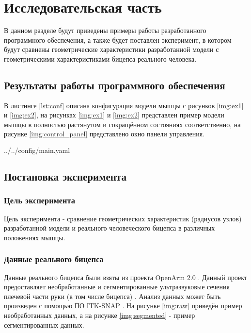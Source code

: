 \chapter{Исследовательская часть}

В данном разделе будут приведены примеры работы разработанного программного обеспечения, а также будет поставлен эксперимент, в котором будут сравнены геометрические характеристики разработанной модели с геометрическими характеристиками бицепса реального человека.

\section{Результаты работы программного обеспечения}

В листинге \ref{lst:conf} описана конфигурация модели мышцы с рисунков \ref{img:ex1} и \ref{img:ex2}, на рисунках \ref{img:ex1} и \ref{img:ex2} представлен пример модели мышцы в полностью растянутом и сокращённом состояниях соответственно, на рисунке \ref{img:control_panel} представлено окно панели управления.

\begin{lstinputlisting}[
        caption={Конфигурация для мышцы из примера.},
        label={lst:conf},
        style={rust}
    ]{../../config/main.yaml}
\end{lstinputlisting}
\clearpage
{}
\clearpage
{}

\section{Постановка эксперимента}

\subsection{Цель эксперимента}

Цель эксперимента - сравнение геометрических характеристик (радиусов узлов) разработанной модели и реального человеческого бицепса в различных положениях мышцы.

\subsection{Данные реального бицепса}

Данные реального бицепса были взяты из проекта OpenArm 2.0 \cite{openarm}. Данный проект предоставляет необработанные и сегментированные ультразвуковые сечения плечевой части руки (в том числе бицепса) \cite{openarm1}. Анализ данных может быть произведен с помощью ПО ITK-SNAP \cite{itk}. На рисунке \ref{img:raw} приведён пример необработанных данных, а на рисунке \ref{img:segmented} - пример сегментированных данных.

